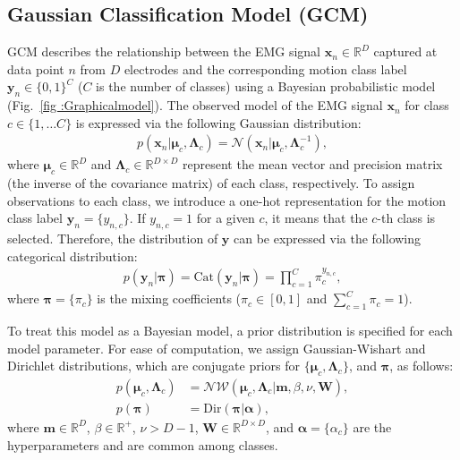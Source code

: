 \documentclass[letterpaper, 10 pt, conference]{ieeeconf}
\begin{document}
\subsection{Gaussian Classification Model (GCM)}
GCM describes the relationship between the EMG signal $\mathbf{x}_{n}\in\mathbb{R}^{D}$ captured at data point $n$ from $D$ electrodes and the corresponding motion class label $\mathbf{y}_n\in\{0,1\}^{C}$ ($C$ is the number of classes) using a Bayesian probabilistic model (Fig.~\ref{fig :Graphicalmodel}). 
The observed model of the EMG signal $\mathbf{x}_{n}$ for class $c \in \{1,\dots C\}$ is expressed via the following Gaussian distribution:
\begin{align}
    p(\mathbf{x}_n|\boldsymbol{\mu}_{c},\mathbf{\Lambda}_{c})=\mathcal{N}(\mathbf{x}_n|\boldsymbol{\mu}_{c},\mathbf{\Lambda}_{c}^{-1}), \label{Gaussian}
\end{align}
where $\boldsymbol{\mu}_{c}\in\mathbb{R}^{D}$ and $\boldsymbol{\Lambda}_{c}\in\mathbb{R}^{D\times D}$ represent the mean vector and precision matrix (the inverse of the covariance matrix) of each class, respectively.
To assign observations to each class, we introduce a one-hot representation for the motion class label $\mathbf{y}_{n}=\{y_{n,c}\}$. 
If $y_{n,c}=1$ for a given $c$, it means that the $c$-th class is selected.
Therefore, the distribution of $\mathbf{y}$ can be expressed via the following categorical distribution:
\begin{align}
    p(\mathbf{y}_{n}|\boldsymbol{\pi})=\text{Cat}(\mathbf{y}_{n}|\boldsymbol{\pi}) 
    =\prod_{c=1}^{C}{\pi}_{c}^{y_{n,c}}, \label{categorical}
\end{align}
where $\boldsymbol{\pi}=\{\pi_c\}$ is the mixing coefficients ($\pi_{c}\in[0,1]$ and $\sum_{c=1}^{C}\pi_{c}=1$).

To treat this model as a Bayesian model, a prior distribution is specified for each model parameter.
For ease of computation, we assign Gaussian-Wishart and Dirichlet distributions, which are conjugate priors for $\{\boldsymbol{\mu}_c, \boldsymbol{\Lambda}_c\}$, and $\boldsymbol{\pi}$, as follows:
\begin{align}
    p(\boldsymbol{\mu}_{c},\mathbf{\Lambda}_{c})&=\mathcal{NW}(\boldsymbol{\mu}_{c},\mathbf{\Lambda}_{c}|\mathbf{m},\beta,\nu,\mathbf{W}), \label{gauswhisert}\\
    p(\boldsymbol{\pi})&=\text{Dir}(\boldsymbol{\pi}|\boldsymbol{\alpha}), \label{dirikure} 
\end{align}
where $\mathbf{m}\in\mathbb{R}^{D}$, $\beta\in\mathbb{R}^{+}$, $\nu > D - 1$, $\mathbf{W}\in\mathbb{R}^{D\times D}$, and $\boldsymbol{\alpha} = \{\alpha_c\}$ are the hyperparameters and are common among classes.
\end{document}
